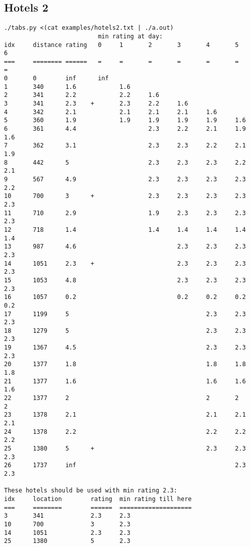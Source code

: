 \documentclass[a4paper,10pt,ngerman]{scrartcl}
\begin{document}
\subsection*{Hotels 2}
\begin{lstlisting}
./tabs.py <(cat examples/hotels2.txt | ./a.out)
                          min rating at day:
idx     distance rating   0     1       2       3       4       5       6
===     ======== ======   =     =       =       =       =       =       =
0       0        inf      inf
1       340      1.6            1.6
2       341      2.2            2.2     1.6
3       341      2.3    +       2.3     2.2     1.6
4       342      2.1            2.1     2.1     2.1     1.6
5       360      1.9            1.9     1.9     1.9     1.9     1.6
6       361      4.4                    2.3     2.2     2.1     1.9     1.6
7       362      3.1                    2.3     2.3     2.2     2.1     1.9
8       442      5                      2.3     2.3     2.3     2.2     2.1
9       567      4.9                    2.3     2.3     2.3     2.3     2.2
10      700      3      +               2.3     2.3     2.3     2.3     2.3
11      710      2.9                    1.9     2.3     2.3     2.3     2.3
12      718      1.4                    1.4     1.4     1.4     1.4     1.4
13      987      4.6                            2.3     2.3     2.3     2.3
14      1051     2.3    +                       2.3     2.3     2.3     2.3
15      1053     4.8                            2.3     2.3     2.3     2.3
16      1057     0.2                            0.2     0.2     0.2     0.2
17      1199     5                                      2.3     2.3     2.3
18      1279     5                                      2.3     2.3     2.3
19      1367     4.5                                    2.3     2.3     2.3
20      1377     1.8                                    1.8     1.8     1.8
21      1377     1.6                                    1.6     1.6     1.6
22      1377     2                                      2       2       2
23      1378     2.1                                    2.1     2.1     2.1
24      1378     2.2                                    2.2     2.2     2.2
25      1380     5      +                               2.3     2.3     2.3
26      1737     inf                                            2.3     2.3

These hotels should be used with min rating 2.3:
idx     location        rating  min rating till here
===     ========        ======  ====================
3       341             2.3     2.3
10      700             3       2.3
14      1051            2.3     2.3
25      1380            5       2.3
\end{lstlisting}
\end{document}
